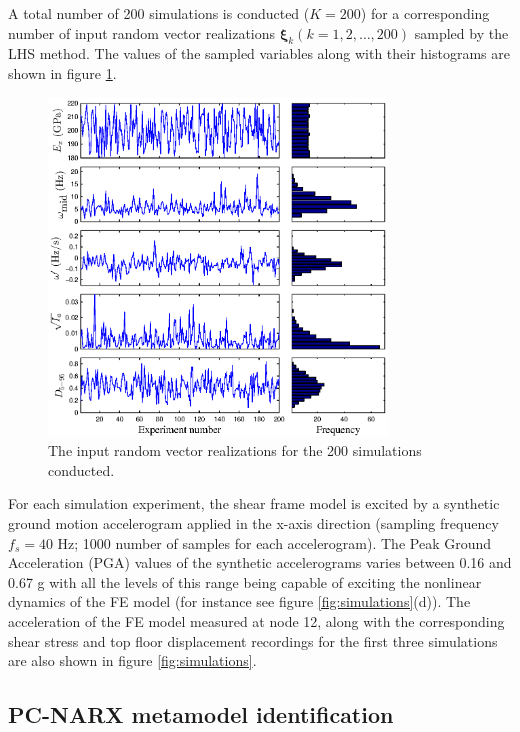 \documentclass[12pt,a4paper,twocolumn,fleqn]{narms}
\newcommand{\bld}[1]{\boldsymbol{#1}}
\newcommand{\bxi}{\bld{\xi}}
\begin{document}
A total number of 200 simulations is conducted ($K =200$) for a corresponding number of input random vector realizations $\bxi_k (k=1,2,\ldots,200)$ sampled by the LHS method. The values of the sampled variables along with their histograms are shown in figure \ref{fig:sim_inputs}.

\begin{figure}
\centering\includegraphics[width=9cm]{figs/input_pars.eps}
\caption{The input random vector realizations for the 200 simulations conducted.}\label{fig:sim_inputs}
\end{figure}


For each simulation experiment, the shear frame model is excited by a synthetic ground motion accelerogram applied in the x-axis direction (sampling frequency $f_s = 40$ Hz; 1000 number of samples for each accelerogram). The Peak Ground Acceleration (PGA) values of the synthetic accelerograms varies between 0.16 and 0.67 g with all the levels of this range being capable of exciting the nonlinear dynamics of the FE model (for instance see figure \ref{fig:simulations}(d)). The acceleration of the FE model measured at node 12, along with the corresponding shear stress and top floor displacement recordings for the first three simulations are also shown in figure \ref{fig:simulations}.


\subsection{PC-NARX metamodel identification}
\end{document}
